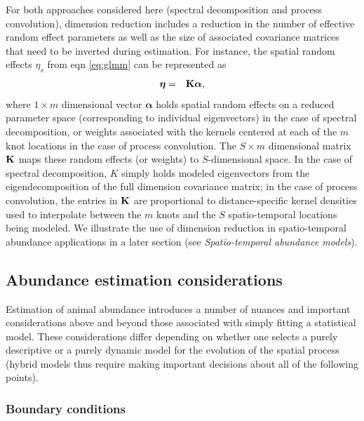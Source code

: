 \documentclass[times,mee,doublespace,]{besauth2}
\begin{document}
For both approaches considered here (spectral decomposition and process convolution), dimension reduction includes a reduction in the number of effective random effect parameters as well as the size of associated covariance matrices that need to be inverted during estimation.  For instance, the spatial random effects $\eta_s$ from eqn \ref{eq:glmm} can be represented as
\begin{eqnarray}
   \boldsymbol{\eta} & = & {\bf K} \boldsymbol{\alpha},
 \label{eq:reduced-spat}
\end{eqnarray}
where $1 \times m$ dimensional vector $\boldsymbol{\alpha}$ holds spatial random effects on a reduced parameter space (corresponding to individual eigenvectors) in the case of spectral decomposition, or weights associated with the kernels centered at each of the $m$ knot locations in the case of process convolution. The $S \times m$ dimensional matrix ${\bf K}$ maps these random effects (or weights) to $S$-dimensional space.  In the case of spectral decomposition, $K$ simply holds modeled eigenvectors from the eigendecomposition of the full dimension covariance matrix; in the case of process convolution, the entries in ${\bf K}$ are proportional to distance-specific kernel densities used to interpolate between the $m$ knots and the $S$ spatio-temporal locations being modeled.  We illustrate the use of dimension reduction in spatio-temporal abundance applications in a later section (see {\it Spatio-temporal abundance models}).

\subsection{Abundance estimation considerations}

Estimation of animal abundance introduces a number of nuances and important considerations above and beyond those associated with simply fitting a statistical model.  These considerations differ depending on whether one selects a purely descriptive or a purely dynamic model for the evolution of the spatial process (hybrid models thus require making important decisions about all of the following points).

\subsubsection{Boundary conditions}
\end{document}
